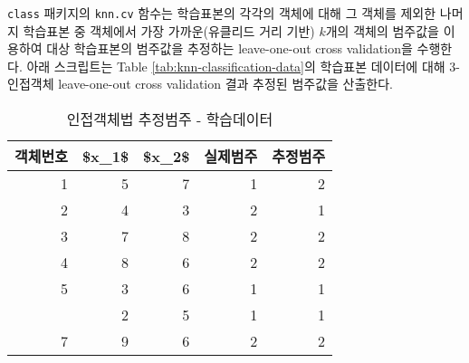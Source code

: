 \documentclass[]{book}
\newenvironment{Shaded}{\begin{snugshade}}{\end{snugshade}}
\newcommand{\DataTypeTok}[1]{\textcolor[rgb]{0.13,0.29,0.53}{#1}}
\newcommand{\DecValTok}[1]{\textcolor[rgb]{0.00,0.00,0.81}{#1}}
\newcommand{\KeywordTok}[1]{\textcolor[rgb]{0.13,0.29,0.53}{\textbf{#1}}}
\newcommand{\NormalTok}[1]{#1}
\newcommand{\OperatorTok}[1]{\textcolor[rgb]{0.81,0.36,0.00}{\textbf{#1}}}
\newcommand{\OtherTok}[1]{\textcolor[rgb]{0.56,0.35,0.01}{#1}}
\newcommand{\StringTok}[1]{\textcolor[rgb]{0.31,0.60,0.02}{#1}}
\begin{document}
\texttt{class} 패키지의 \texttt{knn.cv} 함수는 학습표본의 각각의 객체에 대해 그 객체를 제외한 나머지 학습표본 중 객체에서 가장 가까운(유클리드 거리 기반) \(k\)개의 객체의 범주값을 이용하여 대상 학습표본의 범주값을 추정하는 leave-one-out cross validation을 수행한다. 아래 스크립트는 Table \ref{tab:knn-classification-data}의 학습표본 데이터에 대해 3-인접객체 leave-one-out cross validation 결과 추정된 범주값을 산출한다.

\begin{Shaded}
\end{Shaded}

\begin{table}[t]

\caption{\label{tab:knn-classification-cv}인접객체법 추정범주 - 학습데이터}
\centering
\begin{tabular}{rrrrr}
\toprule
객체번호 & \$x\_1\$ & \$x\_2\$ & 실제범주 & 추정범주\\
\midrule
1 & 5 & 7 & 1 & 2\\
2 & 4 & 3 & 2 & 1\\
3 & 7 & 8 & 2 & 2\\
4 & 8 & 6 & 2 & 2\\
5 & 3 & 6 & 1 & 1\\
\addlinespace
6 & 2 & 5 & 1 & 1\\
7 & 9 & 6 & 2 & 2\\
\bottomrule
\end{tabular}
\end{table}
\end{document}
